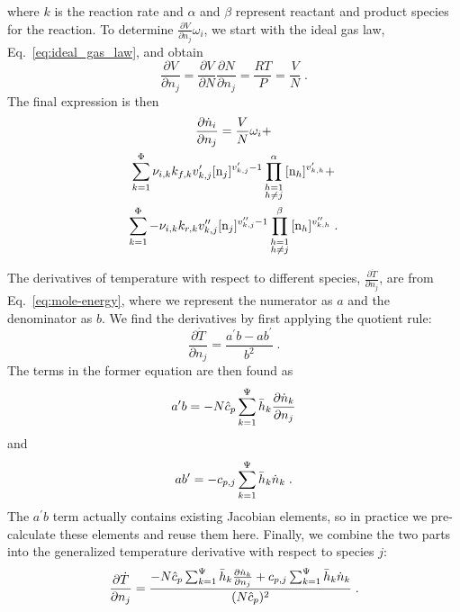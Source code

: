 \documentclass[twocolumn,10pt]{article}
\newcommand{\revised}[2]{#1}  %
\begin{document}
where $k$ is the reaction rate and $\alpha$ and $\beta$ represent reactant and product species for the reaction.
To determine $\frac{\partial V}{\partial n_j} \omega_i$, we start with the ideal gas law, \revised{Eq.~\eqref{eq:ideal_gas_law}, and obtain}{editor}
\begin{equation}
    \frac{\partial V}{\partial n_j} = \frac{\partial V}{\partial N}\frac{\partial N}{\partial n_j} = \frac{RT}{P} = \frac{V}{N} \;.
\end{equation}
The final expression is then
\begin{multline}
    \frac{\partial \dot{n}_i}{\partial n_j} = \frac{V}{N} \omega_i + \\
    \ReacSum{\nu_{i,k} k_{f,k}{v_{k,j}^\prime} \conc{n_j}^{v_{k,j}^\prime-1}\ReactSpecProd{\conc{n_h}^{v_{k,h}^\prime}}} + \\
    \ReacSum{-\nu_{i,k} k_{r,k}v_{k,j}^{\prime\prime}\conc{n_j}^{v_{k,j}^{\prime\prime}-1}\ProdSpecProd{\conc{n_h}^{v_{k,h}^{\prime\prime}}}} \;.
\end{multline}
%
%

The derivatives of temperature with respect to different species, $\frac{\partial\dot{T}}{\partial n_j}$, are from Eq.~\eqref{eq:mole-energy}, where we represent the numerator as $a$ and the denominator as $b$.
We find the derivatives by first applying the quotient rule:
\begin{equation}
    \frac{\partial \dot{T}}{\partial n_j} = \frac{a^\prime b - ab^\prime}{b^2} \;.
\end{equation}
The terms in the former equation are then found as
\begin{equation}
    a^\prime b = -N\hat{c}_p\sum_{k=1}^{\Psi}{\bar{h}_k \frac{\partial \dot{n}_k}{\partial n_j}}
\end{equation}
and
\begin{equation}
    a b^\prime = -c_{p,j}\sum_{k=1}^{\Psi}{\bar{h}_k \dot{n}_k} \;.
\end{equation}
The $a^\prime b$ term actually contains existing Jacobian elements, so in practice we pre-calculate these elements and reuse them here.
Finally, we combine the two parts into the generalized temperature derivative with respect to species $j$:
\begin{equation}
    \label{eq:temp-species}
    \frac{\partial \dot{T}}{\partial n_j} = \frac{-N\hat{c}_p\sum_{k=1}^{\Psi}{\bar{h}_k \frac{\partial \dot{n}_k}{\partial n_j}} + c_{p,j}\sum_{k=1}^{\Psi}{\bar{h}_k \dot{n}_k}}{(N\hat{c}_p)^2} \;.
\end{equation}
\end{document}
